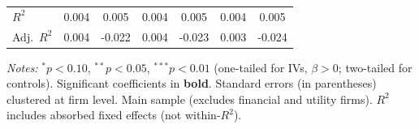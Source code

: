 \begin{landscape}
\begin{table}[H]
\begin{tabular}{lcccccc}
$R^2$ & 0.004 & 0.005 & 0.004 & 0.005 & 0.004 & 0.005 \\
Adj.~$R^2$ & 0.004 & -0.022 & 0.004 & -0.023 & 0.003 & -0.024 \\
\bottomrule
\end{tabular}
\begin{minipage}{\linewidth}
\vspace{2pt}\scriptsize
\textit{Notes:} $^{*}p<0.10$, $^{**}p<0.05$, $^{***}p<0.01$ (one-tailed for IVs, $\beta > 0$; two-tailed for controls).
 Significant coefficients in \textbf{bold}.
 Standard errors (in parentheses) clustered at firm level.
 Main sample (excludes financial and utility firms).
 $R^2$ includes absorbed fixed effects (not within-$R^2$).
\end{minipage}
\end{table}
\end{landscape}